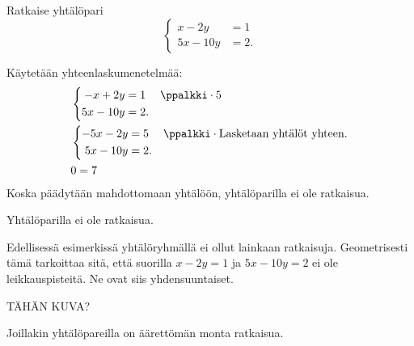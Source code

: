 \begin{esimerkki}
Ratkaise yhtälöpari
\[
\left\{
\begin{aligned}
x-2y&= 1 \\
5x-10y&= 2.
\end{aligned}
\right.
\]
\begin{esimratk}
Käytetään yhteenlaskumenetelmää:
\begin{align*}
&\left\{
\begin{aligned}
-x+2y&= 1 && \ppalkki \cdot 5 \\
5x-10y&= 2. &&
\end{aligned}
\right. \\
&\left\{
\begin{aligned}
-5x-2y&= 5 && \ppalkki \cdot \text{Lasketaan yhtälöt yhteen.} \\
5x-10y&= 2. &&
\end{aligned}
\right. \\
&0=7 \\
\end{align*}
Koska päädytään mahdottomaan yhtälöön, yhtälöparilla ei ole ratkaisua.
\end{esimratk}
\begin{esimvast}
Yhtälöparilla ei ole ratkaisua.
\end{esimvast}
\end{esimerkki}

Edellisessä esimerkissä yhtälöryhmällä ei ollut lainkaan ratkaisuja. Geometrisesti tämä tarkoittaa sitä, että suorilla $x-2y= 1$ ja $5x-10y= 2$ ei ole leikkauspisteitä. Ne ovat siis yhdensuuntaiset.

TÄHÄN KUVA?

Joillakin yhtälöpareilla on äärettömän monta ratkaisua.

